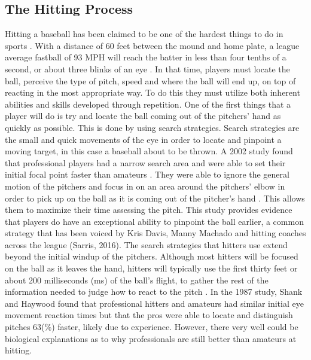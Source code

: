 \documentclass{article}
\begin{document}
\begin{doublespace}
\section{The Hitting Process}
Hitting a baseball has been claimed to be one of the hardest things to do in sports \citep{Regan}. With a distance of 60 feet between the mound and home plate, a league average fastball of 93 MPH will reach the batter in less than four tenths of a second, or about three blinks of an eye \citep{Shank}. In that time, players must locate the ball, perceive the type of pitch, speed and where the ball will end up, on top of reacting in the most appropriate way. To do this they must utilize both inherent abilities and skills developed through repetition. One of the first things that a player will do is try and locate the ball coming out of the pitchers’ hand as quickly as possible. This is done by using search strategies. Search strategies are the small and quick movements of the eye in order to locate and pinpoint a moving target, in this case a baseball about to be thrown. A 2002 study found that professional players had a narrow search area and were able to set their initial focal point faster than amateurs \citep{Kato}. They were able to ignore the general motion of the pitchers and focus in on an area around the pitchers’ elbow in order to pick up on the ball as it is coming out of the pitcher’s hand \citep{Kato}. This allows them to maximize their time assessing the pitch. This study provides evidence that players do have an exceptional ability to pinpoint the ball earlier, a common strategy that has been voiced by Kris Davis, Manny Machado and hitting coaches across the league (Sarris, 2016). The search strategies that hitters use extend beyond the initial windup of the pitchers. Although most hitters will be focused on the ball as it leaves the hand, hitters will typically use the first thirty feet or about 200 milliseconds (ms) of the ball’s flight, to gather the rest of the information needed to judge how to react to the pitch \citep{Shank}. In the 1987 study, Shank and Haywood found that professional hitters and amateurs had similar initial eye movement reaction times but that the pros were able to locate and distinguish pitches 63(\%) faster, likely due to experience. However, there very well could be biological explanations as to why professionals are still better than amateurs at hitting. 


\end{doublespace}
\end{document}

